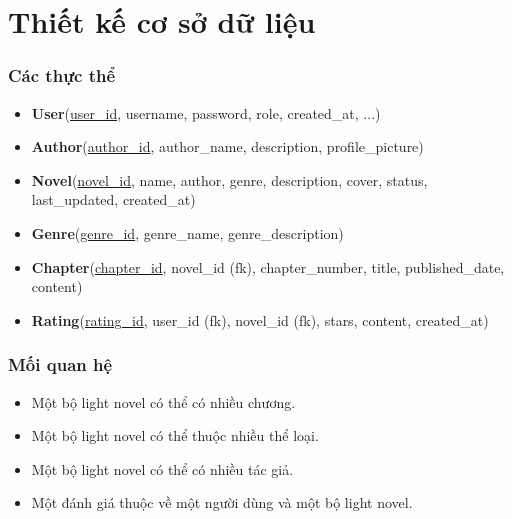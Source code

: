 \documentclass[12pt,aspectratio=169,handout]{beamer}
\begin{document}

\section{Thiết kế cơ sở dữ liệu}

\begin{frame}
    \frametitle{Các thực thể}
    \begin{itemize}
        \item \textbf{User}(\underline{user\_id}, username, password, role, created\_at, ...)
        \item \textbf{Author}(\underline{author\_id}, author\_name, description, profile\_picture)
        \item \textbf{Novel}(\underline{novel\_id}, name, author, genre, description, cover, status, last\_updated, created\_at)
        \item \textbf{Genre}(\underline{genre\_id}, genre\_name, genre\_description)
        \item \textbf{Chapter}(\underline{chapter\_id}, novel\_id (fk), chapter\_number, title, published\_date, content)
        \item \textbf{Rating}(\underline{rating\_id}, user\_id (fk), novel\_id (fk), stars, content, created\_at)
    \end{itemize}
\end{frame}

\begin{frame}
    \frametitle{Mối quan hệ}
    \begin{itemize}
        \item Một bộ light novel có thể có nhiều chương.
        \item Một bộ light novel có thể thuộc nhiều thể loại.
        \item Một bộ light novel có thể có nhiều tác giả.
        \item Một đánh giá thuộc về một người dùng và một bộ light novel.
    \end{itemize}
\end{frame}
\end{document}
